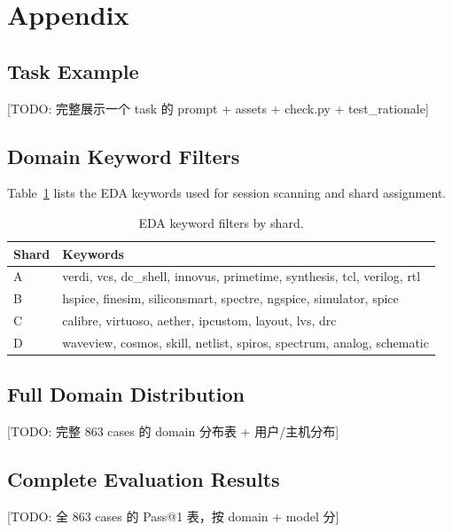 \section{Appendix}
\label{sec:appendix}

\subsection{Task Example}
\label{sec:task-example}

[TODO: 完整展示一个 task 的 prompt + assets + check.py + test\_rationale]

\subsection{Domain Keyword Filters}
\label{sec:keyword-filters}

Table~\ref{tab:keywords} lists the EDA keywords used for session scanning and shard assignment.

\begin{table}[ht]
\centering
\small
\caption{EDA keyword filters by shard.}
\label{tab:keywords}
\begin{tabular}{@{}ll@{}}
\toprule
\textbf{Shard} & \textbf{Keywords} \\
\midrule
A & verdi, vcs, dc\_shell, innovus, primetime, synthesis, tcl, verilog, rtl \\
B & hspice, finesim, siliconsmart, spectre, ngspice, simulator, spice \\
C & calibre, virtuoso, aether, ipcustom, layout, lvs, drc \\
D & waveview, cosmos, skill, netlist, spiros, spectrum, analog, schematic \\
\bottomrule
\end{tabular}
\end{table}

\subsection{Full Domain Distribution}
\label{sec:full-distribution}

[TODO: 完整 863 cases 的 domain 分布表 + 用户/主机分布]

\subsection{Complete Evaluation Results}
\label{sec:full-results}

[TODO: 全 863 cases 的 Pass@1 表，按 domain + model 分]
